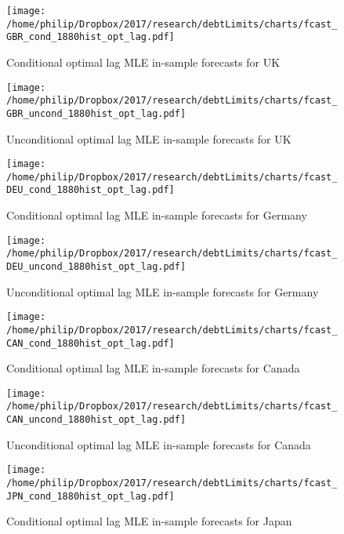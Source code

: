 \documentclass{article}
\begin{document}
	\begin{figure}[htbp]
	    \centering
		\texttt{[image: /home/philip/Dropbox/2017/research/debtLimits/charts/fcast\_GBR\_cond\_1880hist\_opt\_lag.pdf]}
		\caption{Conditional optimal lag MLE in-sample forecasts for UK}
	\end{figure}
	
	\begin{figure}[htbp]
	    \centering
		\texttt{[image: /home/philip/Dropbox/2017/research/debtLimits/charts/fcast\_GBR\_uncond\_1880hist\_opt\_lag.pdf]}
		\caption{Unconditional optimal lag MLE in-sample forecasts for UK}
	\end{figure}
	
	\begin{figure}[htbp]
	    \centering
		\texttt{[image: /home/philip/Dropbox/2017/research/debtLimits/charts/fcast\_DEU\_cond\_1880hist\_opt\_lag.pdf]}
		\caption{Conditional optimal lag MLE in-sample forecasts for Germany}
	\end{figure}
	
	\begin{figure}[htbp]
	    \centering
		\texttt{[image: /home/philip/Dropbox/2017/research/debtLimits/charts/fcast\_DEU\_uncond\_1880hist\_opt\_lag.pdf]}
		\caption{Unconditional optimal lag MLE in-sample forecasts for Germany}
	\end{figure}
	
		\begin{figure}[htbp]
	    \centering
		\texttt{[image: /home/philip/Dropbox/2017/research/debtLimits/charts/fcast\_CAN\_cond\_1880hist\_opt\_lag.pdf]}
		\caption{Conditional optimal lag MLE in-sample forecasts for Canada}
	\end{figure}
	
	\begin{figure}[htbp]
	    \centering
		\texttt{[image: /home/philip/Dropbox/2017/research/debtLimits/charts/fcast\_CAN\_uncond\_1880hist\_opt\_lag.pdf]}
		\caption{Unconditional optimal lag MLE in-sample forecasts for Canada}
	\end{figure}
	
	\begin{figure}[htbp]
	    \centering
		\texttt{[image: /home/philip/Dropbox/2017/research/debtLimits/charts/fcast\_JPN\_cond\_1880hist\_opt\_lag.pdf]}
		\caption{Conditional optimal lag MLE in-sample forecasts for Japan}
	\end{figure}
	
\end{document}
